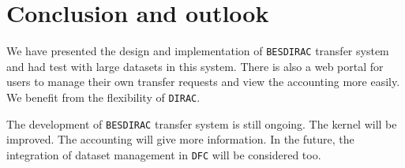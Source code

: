 \section{Conclusion and outlook}
We have presented the design and implementation of {\tt BESDIRAC} transfer system
and had test with large datasets in this system.
There is also a web portal for users to manage their own transfer requests
and view the accounting more easily.
We benefit from the flexibility of {\tt DIRAC}.

The development of {\tt BESDIRAC} transfer system is still ongoing.
The kernel will be improved.
The accounting will give more information.
In the future, the integration of dataset management in 
{\tt DFC} will be considered too.
